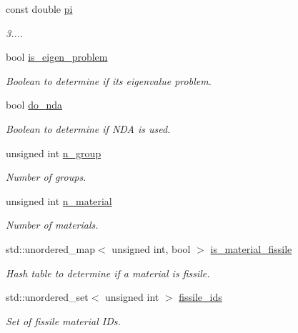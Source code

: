 \begin{DoxyCompactItemize}
\item 
const double \hyperlink{class_material_properties_a28173c461cf9a74c3b0ebe0f51c386d3}{pi}
\begin{DoxyCompactList}\small\item\em 3.... \end{DoxyCompactList}\item 
bool \hyperlink{class_material_properties_a2193d0f80fcfbba74a2e84fae0518097}{is\+\_\+eigen\+\_\+problem}
\begin{DoxyCompactList}\small\item\em Boolean to determine if it\textquotesingle{}s eigenvalue problem. \end{DoxyCompactList}\item 
bool \hyperlink{class_material_properties_a911d589ba4b11eee87ce5748b760437a}{do\+\_\+nda}
\begin{DoxyCompactList}\small\item\em Boolean to determine if N\+DA is used. \end{DoxyCompactList}\item 
unsigned int \hyperlink{class_material_properties_a4cae7eee21ea5ed5246765c049caf58b}{n\+\_\+group}
\begin{DoxyCompactList}\small\item\em Number of groups. \end{DoxyCompactList}\item 
unsigned int \hyperlink{class_material_properties_a3bc9713ea94f32fb93d60f2a726e4f2d}{n\+\_\+material}
\begin{DoxyCompactList}\small\item\em Number of materials. \end{DoxyCompactList}\item 
std\+::unordered\+\_\+map$<$ unsigned int, bool $>$ \hyperlink{class_material_properties_a232e0fa7b96e2d93597e4dd6839b5223}{is\+\_\+material\+\_\+fissile}
\begin{DoxyCompactList}\small\item\em Hash table to determine if a material is fissile. \end{DoxyCompactList}\item 
std\+::unordered\+\_\+set$<$ unsigned int $>$ \hyperlink{class_material_properties_a43cff88edebbd4e4f2a012c6639e0b89}{fissile\+\_\+ids}
\begin{DoxyCompactList}\small\item\em Set of fissile material I\+Ds. \end{DoxyCompactList}\item 

\end{DoxyCompactItemize}
